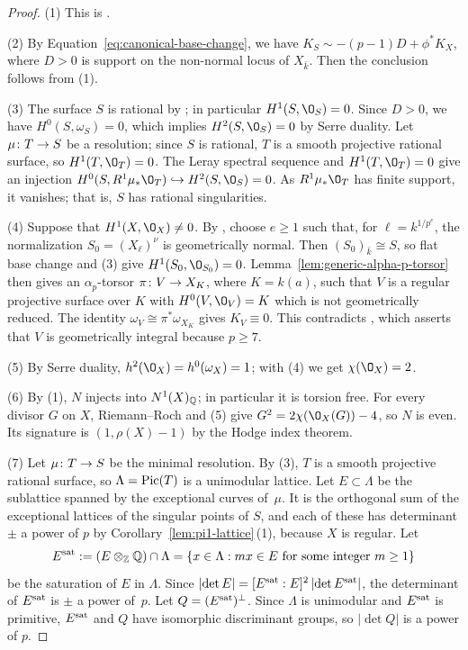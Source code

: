 \begin{proof}
(1) This is \cite[Corollary~6.2]{CWZ26}.

(2) 
By Equation~\eqref{eq:canonical-base-change}, we have $K_S \sim -(p-1)D + \phi^*K_X$, where $D>0$ is support on the non-normal locus of $X_{\bar k}$.
Then the conclusion follows from (1).

(3) The surface $S$ is rational by \cite[Proposition~5.21]{BF25}; in particular $H^1(S,\O_S) = 0$.
Since $D > 0$, we have $H^0(S,\omega_S) = 0$, which implies $H^2(S,\O_S) = 0$ by Serre duality.
Let $\mu\colon T\to S$ be a resolution; since $S$ is rational, $T$ is a smooth projective rational surface, so $H^1(T,\O_T) = 0$.
The Leray spectral sequence and $H^1(T,\O_T) = 0$ give an injection $H^0(S,R^1\mu_*\O_T)\embed H^2(S,\O_S) = 0$.
As $R^1\mu_*\O_T$ has finite support, it vanishes; that is, $S$ has rational singularities.

(4) Suppose that $H^1(X,\O_X)\neq 0$.
By \cite[Remark~5.2]{Tan21}, choose $e\geq 1$ such that, for $\ell = k^{1/p^e}$, the normalization $S_0 = (X_\ell)^\nu$ is geometrically normal.
Then $(S_0)_{\bar k}\cong S$, so flat base change and \textup{(3)} give $H^1(S_0,\O_{S_0}) = 0$.
Lemma~\ref{lem:generic-alpha-p-torsor} then gives an $\alpha_p$-torsor $\pi\colon V\to X_K$, where $K = k(a)$, such that $V$ is a regular projective surface over $K$ with $H^0(V,\O_V) = K$ which is not geometrically reduced.
The identity $\omega_V\cong\pi^*\omega_{X_K}$ gives $K_V\equiv 0$.
This contradicts \cite[Theorem~1.2]{WZ26}, which asserts that $V$ is geometrically integral because $p\geq 7$.

(5) By Serre duality, $h^2(\O_X) = h^0(\omega_X) = 1$; with \textup{(4)} we get $\chi(\O_X) = 2$.

(6) By \textup{(1)}, $N$ injects into $N^1(X)_{\mathbb{Q}}$; in particular it is torsion free.
For every divisor $G$ on $X$, Riemann--Roch and \textup{(5)} give $G^2 = 2\chi(\O_X(G))-4$, so $N$ is even.
Its signature is $(1,\rho(X)-1)$ by the Hodge index theorem.

(7) Let $\mu\colon T\to S$ be the minimal resolution.
By \textup{(3)}, $T$ is a smooth projective rational surface, so $\Lambda = \operatorname{Pic}(T)$ is a unimodular lattice.
Let $E\subset\Lambda$ be the sublattice spanned by the exceptional curves of~$\mu$.
It is the orthogonal sum of the exceptional lattices of the singular points of $S$, and each of these has determinant $\pm$ a power of $p$ by Corollary~\ref{lem:pi1-lattice}\,(1), because $X$ is regular.
Let 
\[
  E^{\rm sat} := (E\otimes_{\mathbb{Z}}\mathbb{Q})\cap\Lambda
  = \{x\in\Lambda : mx\in E\text{ for some integer }m\geq 1\}
\]
be the saturation of $E$ in $\Lambda$.
Since $\lvert\det E\rvert = [E^{\rm sat}:E]^2\,\lvert\det E^{\rm sat}\rvert$, the determinant of $E^{\rm sat}$ is $\pm$ a power of~$p$.
Let $Q = (E^{\rm sat})^\perp$.
Since $\Lambda$ is unimodular and $E^{\rm sat}$ is primitive, $E^{\rm sat}$ and $Q$ have isomorphic discriminant groups, so $\lvert\det Q\rvert$ is a power of $p$.


\end{proof}
